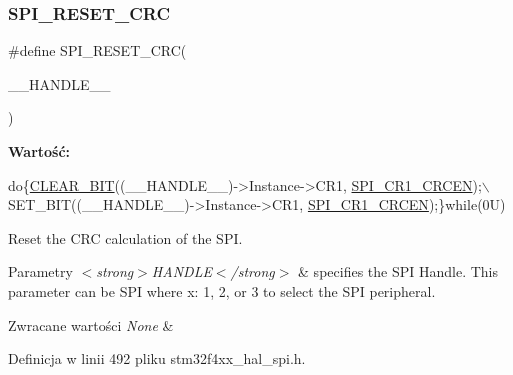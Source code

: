 \subsubsection{\texorpdfstring{S\+P\+I\+\_\+\+R\+E\+S\+E\+T\+\_\+\+C\+RC}{SPI\_RESET\_CRC}}
{\footnotesize\ttfamily \#define S\+P\+I\+\_\+\+R\+E\+S\+E\+T\+\_\+\+C\+RC(\begin{DoxyParamCaption}\item[{}]{\+\_\+\+\_\+\+H\+A\+N\+D\+L\+E\+\_\+\+\_\+ }\end{DoxyParamCaption})}

{\bfseries Wartość\+:}
\begin{DoxyCode}
\textcolor{keywordflow}{do}\{\hyperlink{group___exported__macro_ga133aae6fc0d41bffab39ab223a7001de}{CLEAR\_BIT}((\_\_HANDLE\_\_)->Instance->CR1, \hyperlink{group___peripheral___registers___bits___definition_gac9339b7c6466f09ad26c26b3bb81c51b}{SPI\_CR1\_CRCEN});\(\backslash\)
                                       SET\_BIT((\_\_HANDLE\_\_)->Instance->CR1, 
      \hyperlink{group___peripheral___registers___bits___definition_gac9339b7c6466f09ad26c26b3bb81c51b}{SPI\_CR1\_CRCEN});\}\textcolor{keywordflow}{while}(0U)
\end{DoxyCode}


Reset the C\+RC calculation of the S\+PI. 


\begin{DoxyParams}{Parametry}
{\em $<$strong$>$\+H\+A\+N\+D\+L\+E$<$/strong$>$} & specifies the S\+PI Handle. This parameter can be S\+PI where x\+: 1, 2, or 3 to select the S\+PI peripheral. \\
\hline
\end{DoxyParams}

\begin{DoxyRetVals}{Zwracane wartości}
{\em None} & \\
\hline
\end{DoxyRetVals}


Definicja w linii 492 pliku stm32f4xx\+\_\+hal\+\_\+spi.\+h.

